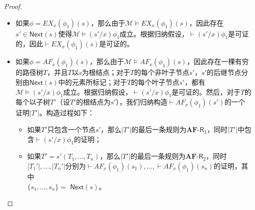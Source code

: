 \begin{proof}
\begin{itemize}
		\item 如果$\phi = EX_x(\phi_1)(s)$，那么由于$\mathcal{M}\models EX_x(\phi_1)(s)$，因此存在$s'\in \mathsf{Next}(s)$使得$\mathcal{M}\models (s'/x)\phi_1$成立。根据归纳假设，$\vdash (s'/x)\phi_1$是可证的，因此$\vdash EX_x(\phi_1)(s)$是可证的。
		\item 如果$\phi = AF_x(\phi_1)(s)$，那么由于$\mathcal{M}\models AF_x(\phi_1)(s)$，因此存在一棵有穷的路径树$T$，并且$T$以$s$为根结点；对于$T$的每个非叶子节点$s'$，$s'$的后继节点分别由$\mathsf{Next}(s)$中的元素所标记；对于$T$的每个叶子节点$s'$，都有$\mathcal{M}\models (s'/x)\phi_1$成立。根据归纳假设，$\vdash (s'/x)\phi_1$是可证的。然后，对于$T$的每个以子树$T'$（设$T'$的根结点为$s'$），我们归纳构造$\vdash AF_x(\phi_1)(s')$的一个证明$|T'|$。构造过程如下：
		\begin{itemize}
			
			\item 如果$T'$只包含一个节点$s'$，那么$|T'|$的最后一条规则为$\mathbf{AF}$-$\mathsf{R_1}$，同时$|T'|$中包含$\vdash (s'/x)\phi_1$的证明；
			
			\item 如果$T' = s'(T_1, ..., T_n)$，那么$|T'|$的最后一条规则为$\mathbf{AF}$-$\mathsf{R_2}$，同时$|T_1'|,...,|T_n'|$分别为$\vdash AF_x(\phi_1)(s_1), ..., \vdash AF_x(\phi_1)(s_n)$的证明，其中\\$\{s_1, ..., s_n\}=$ $\mathsf{Next}(s)$。 
		\end{itemize}
		

\end{itemize}
\end{proof}
